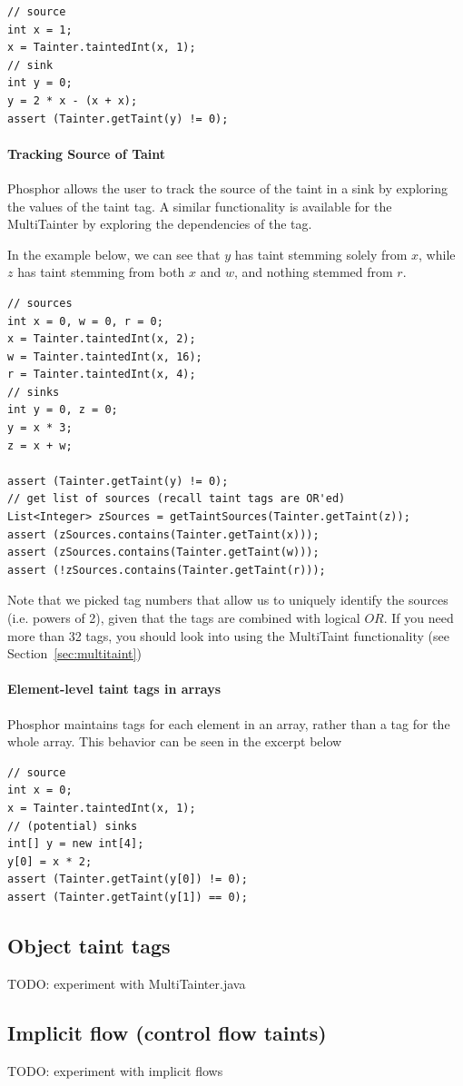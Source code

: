 \documentclass[a4paper]{article}
\begin{document}
\begin{lstlisting}
// source
int x = 1;
x = Tainter.taintedInt(x, 1);
// sink
int y = 0;
y = 2 * x - (x + x);
assert (Tainter.getTaint(y) != 0);
\end{lstlisting}

\paragraph{Tracking Source of Taint}
Phosphor allows the user to track the source of the taint in a sink by exploring the values
of the taint tag. A similar functionality is available for the MultiTainter by exploring
the dependencies of the tag.

In the example below, we can see that $y$ has taint stemming solely from $x$, while $z$ has
taint stemming from both $x$ and $w$, and nothing stemmed from $r$.

\begin{lstlisting}
// sources
int x = 0, w = 0, r = 0;
x = Tainter.taintedInt(x, 2);
w = Tainter.taintedInt(x, 16);
r = Tainter.taintedInt(x, 4);
// sinks
int y = 0, z = 0;
y = x * 3;
z = x + w;

assert (Tainter.getTaint(y) != 0);
// get list of sources (recall taint tags are OR'ed)
List<Integer> zSources = getTaintSources(Tainter.getTaint(z));
assert (zSources.contains(Tainter.getTaint(x)));
assert (zSources.contains(Tainter.getTaint(w)));
assert (!zSources.contains(Tainter.getTaint(r)));
\end{lstlisting}

Note that we picked tag numbers that allow us to uniquely identify the sources (i.e. powers of 2),
given that the tags are combined with logical $OR$. If you need more than 32 tags, you should
look into using the MultiTaint functionality (see Section~\ref{sec:multitaint})


\paragraph{Element-level taint tags in arrays}
Phosphor maintains tags for each element in an array, rather than a tag for the
whole array\cite{bell2014phosphor}. This behavior can be seen in the excerpt below


\begin{lstlisting}
// source
int x = 0;
x = Tainter.taintedInt(x, 1);
// (potential) sinks
int[] y = new int[4];
y[0] = x * 2;
assert (Tainter.getTaint(y[0]) != 0);
assert (Tainter.getTaint(y[1]) == 0);
\end{lstlisting}



\subsection{Object taint tags}
\label{sec:multitant}
TODO: experiment with MultiTainter.java

\subsection{Implicit flow (control flow taints)}
TODO: experiment with implicit flows

\nocite{*}


\end{document}
